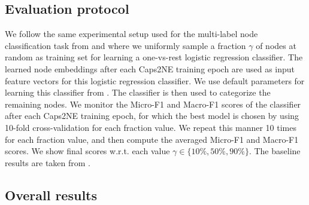\documentclass[sigconf]{acmart}
\begin{document}
\subsection{Evaluation protocol}

We follow the same experimental setup used for the multi-label node classification task from \citet{Perozzi:2014} and \citet{duran2017learning} where we uniformly sample a fraction $\gamma$ of nodes at random as training set for learning a one-vs-rest logistic regression classifier. 
The learned node embeddings after each Caps2NE training epoch are used as input feature vectors  for this logistic regression classifier. We use default parameters for learning this classifier from \citet{Perozzi:2014}. 
The classifier is then used to categorize the remaining nodes.
We monitor the Micro-F1 and Macro-F1 scores of the classifier after  each Caps2NE training epoch, for which the best model is chosen by using 10-fold cross-validation for each fraction value. 
We repeat this manner 10 times for each fraction value, and then compute the averaged Micro-F1 and Macro-F1 scores. We show final scores w.r.t. each value  $\gamma \in \{10\%, 50\%, 90\%\}$.
The baseline results are taken from \citet{duran2017learning}.

\subsection{Overall results}
\end{document}
